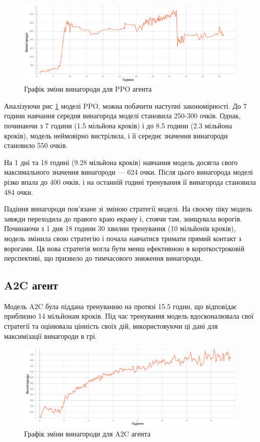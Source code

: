 \begin{figure}[H]
    \centering
    \includegraphics[scale = 0.55]{Pictures/PPO_REWARD.png}
    \caption{Графік зміни винагороди для PPO агента}
    \label{fig:PPO_REWARD}
\end{figure}

Аналізуючи рис \ref{fig:PPO_REWARD} моделі PPO, можна побачити 
наступні закономірності. До 7 години навчання середня винагорода моделі становила 250-300 очків. 
Однак, починаючи з 7 години (1.5 мільйона кроків) і до 8.5 години (2.3 мільйона кроків), модель 
неймовірно вистрілила, і її середнє значення винагороди становило 550 очків.

На 1 дні та 18 годині (9.28 мільйона кроків) навчання модель досягла свого максимального значення 
винагороди — 624 очки. Після цього винагорода моделі різко впала до 400 очків, і на останній годині 
тренування її винагорода становила 484 очки.

Падіння винагороди пов'язане зі зміною стратегії моделі. На своєму піку модель завжди 
переходила до правого краю екрану і, стоячи там, знищувала ворогів. Починаючи з 1 дня 18 години
 30 хвилин тренування (10 мільйонів кроків), модель змінила свою стратегію і почала навчатися тримати
  прямий контакт з ворогами. Ця нова стратегія могла бути менш ефективною в короткостроковій перспективі,
   що призвело до тимчасового зниження винагороди.
\subsection{A2C агент}
Модель A2C була піддана тренуванню на протязі 15.5 годин, що відповідає приблизно 14 мільйонам кроків. 
Під час тренування модель вдосконалювала свої стратегії та оцінювала цінність своїх дій, використовуючи 
ці дані для максимізації винагороди в грі.

\begin{figure}[H]
    \centering
    \includegraphics[scale = 0.55]{Pictures/A2C_REWARD.png}
    \caption{Графік зміни винагороди для A2C агента}
    \label{fig:A2C_REWARD}
\end{figure}

